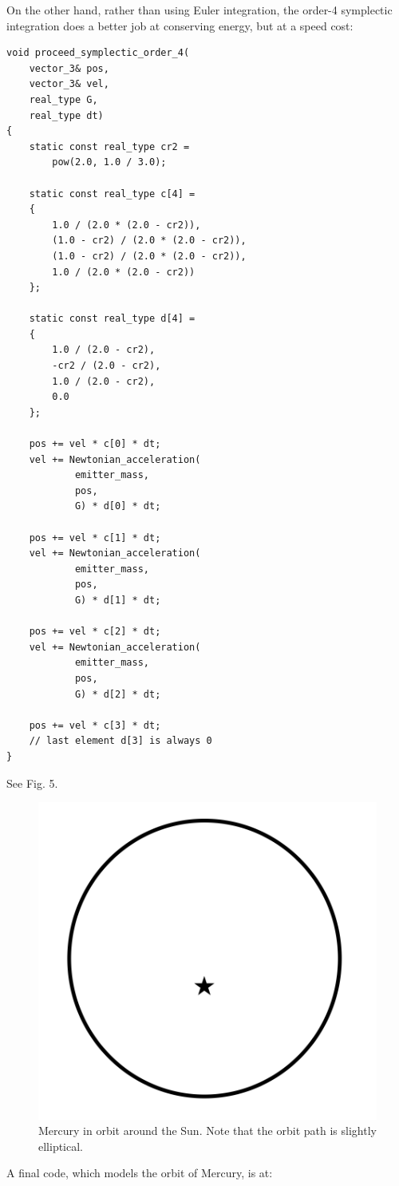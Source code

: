 \documentclass[12pt]{article}
\begin{document}
On the other hand, rather than using Euler integration, the order-4 symplectic integration does a better job at conserving energy, but at a speed cost:
\begin{lstlisting}
void proceed_symplectic_order_4(
	vector_3& pos, 
	vector_3& vel, 
	real_type G, 
	real_type dt)
{
	static const real_type cr2 = 
		pow(2.0, 1.0 / 3.0);

	static const real_type c[4] =
	{
		1.0 / (2.0 * (2.0 - cr2)),
		(1.0 - cr2) / (2.0 * (2.0 - cr2)),
		(1.0 - cr2) / (2.0 * (2.0 - cr2)),
		1.0 / (2.0 * (2.0 - cr2))
	};

	static const real_type d[4] =
	{
		1.0 / (2.0 - cr2),
		-cr2 / (2.0 - cr2),
		1.0 / (2.0 - cr2),
		0.0
	};

	pos += vel * c[0] * dt;
	vel += Newtonian_acceleration(
			emitter_mass, 
			pos, 
			G) * d[0] * dt;

	pos += vel * c[1] * dt;
	vel += Newtonian_acceleration(
			emitter_mass, 
			pos, 
			G) * d[1] * dt;

	pos += vel * c[2] * dt;
	vel += Newtonian_acceleration(
			emitter_mass, 
			pos, 
			G) * d[2] * dt;

	pos += vel * c[3] * dt;
	// last element d[3] is always 0
}
\end{lstlisting}

See Fig. 5.
\begin{figure} 
\centering
  \includegraphics[width = 4 in]{mercury.png}
  \caption{
Mercury in orbit around the Sun.
Note that the orbit path is slightly elliptical.
}
\end{figure}

A final code, which models the orbit of Mercury, is at:
\end{document}
